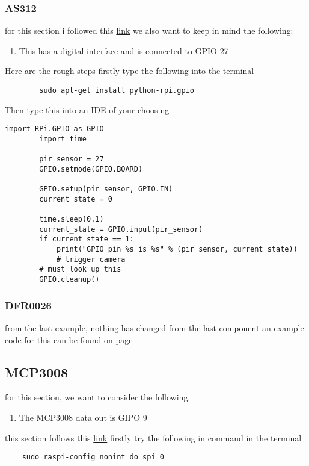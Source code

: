 	\subsubsection{AS312}
	for this section i followed  this \href{https://pimylifeup.com/raspberry-pi-motion-sensor/}{link}
	we also want to keep in mind the following:
	\begin{enumerate}
		\item This has a  digital interface and is connected  to GPIO 27 
	\end{enumerate}
	Here are the rough steps firstly  type the following into the  terminal 
	\begin{verbatim}
		sudo apt-get install python-rpi.gpio
	\end{verbatim}
	\newpage
	Then type this into an IDE of your  choosing
	\begin{lstlisting}[style=mystyle,caption={Example code for AS312}]
		import RPi.GPIO as GPIO
		import time

		pir_sensor = 27
		GPIO.setmode(GPIO.BOARD)

		GPIO.setup(pir_sensor, GPIO.IN)
		current_state = 0
		
		time.sleep(0.1)
		current_state = GPIO.input(pir_sensor)
		if current_state == 1:
			print("GPIO pin %s is %s" % (pir_sensor, current_state))
			# trigger camera
		# must look up this 
		GPIO.cleanup()
	\end{lstlisting}
	
	\subsubsection{DFR0026}	
	from the last example, nothing has changed from the last component
	an example code for this can be found on page \pageref{adc code}
	\subsection{MCP3008}
	for this section, we want to consider the following:
	\begin{enumerate}
		\item The MCP3008 data out is GIPO 9 
	\end{enumerate}
	this section follows this \href{https://randomnerdtutorials.com/raspberry-pi-analog-inputs-python-mcp3008/}{link}
	firstly try the following in command in the terminal 
	\begin{verbatim}
	sudo raspi-config nonint do_spi 0
	\end{verbatim}
	

